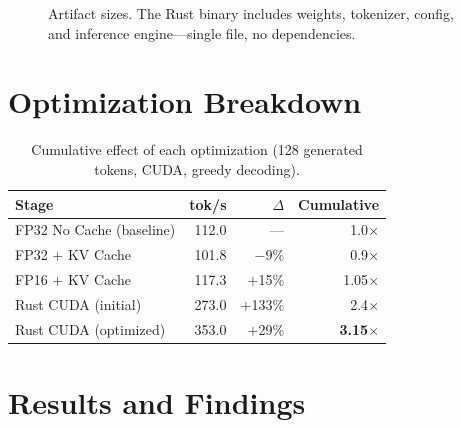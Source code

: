 \documentclass[11pt,a4paper]{article}
\begin{document}
\begin{figure}[H]
\centering
{}
\caption{Artifact sizes. The Rust binary includes weights, tokenizer,
config, and inference engine---single file, no dependencies.}
\label{fig:sizes}
\end{figure}

\section{Optimization Breakdown}

\begin{table}[H]
\centering
\caption{Cumulative effect of each optimization (128 generated tokens,
CUDA, greedy decoding).}
\label{tab:breakdown}
\begin{tabular}{lrrr}
\toprule
\textbf{Stage} & \textbf{tok/s} & \textbf{$\Delta$} & \textbf{Cumulative} \\
\midrule
FP32 No Cache (baseline) & 112.0 & --- & 1.0$\times$ \\
FP32 + KV Cache          & 101.8 & $-$9\% & 0.9$\times$ \\
FP16 + KV Cache          & 117.3 & $+$15\% & 1.05$\times$ \\
Rust CUDA (initial)      & 273.0 & $+$133\% & 2.4$\times$ \\
Rust CUDA (optimized)    & 353.0 & $+$29\% & \textbf{3.15$\times$} \\
\bottomrule
\end{tabular}
\end{table}

\section{Results and Findings}
\end{document}

